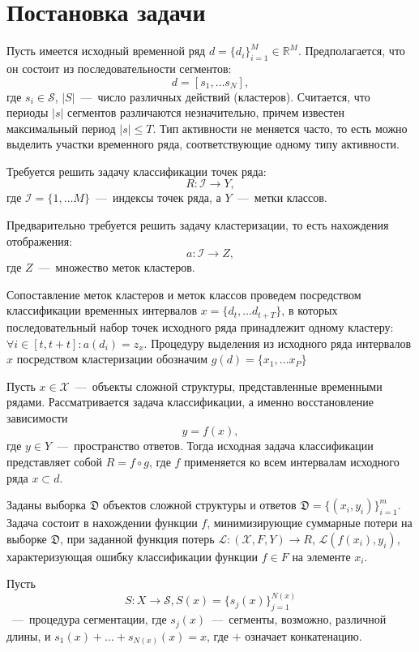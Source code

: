 \documentclass[12pt, twoside]{article}
\begin{document}
\section{Постановка задачи}

Пусть имеется исходный временной ряд $d=\{d_i\}_{i=1}^M\in \mathds{R}^M$. Предполагается, что он состоит из последовательности сегментов: $$d=[s_1,\ldots s_N],$$ где $s_i\in \mathcal{S}$, $|S|$~---~число различных действий (кластеров). Считается, что периоды $|s|$ сегментов различаются незначительно, причем известен максимальный период $|s|\leq T$. Тип активности не меняется часто, то есть можно выделить участки временного ряда, соответствующие одному типу активности.

Требуется решить задачу классификации точек ряда: $$R:\mathcal{I}\rightarrow Y,$$ где $\mathcal{I}=\{1,\ldots M\}$~---~индексы точек ряда, а $Y$~---~метки классов.

Предварительно требуется решить задачу кластеризации, то есть нахождения отображения: $$a:\mathcal{I}\rightarrow Z,$$ где $Z$~---~множество меток кластеров.

Сопоставление меток кластеров и меток классов проведем посредством классификации временных интервалов $x=\{d_t,\ldots d_{t+T}\}$, в которых последовательный набор точек исходного ряда принадлежит одному кластеру: $\forall i\in [t,t+t]:a(d_i)=z_x$. Процедуру выделения из исходного ряда интервалов $x$ посредством кластеризации обозначим $g(d)=\{x_1,\ldots x_P\}$

Пусть $x\in \mathcal{X}$~---~объекты сложной структуры, представленные временными рядами. Рассматривается задача классификации, а именно восстановление зависимости $$y=f(x),$$ где $y\in Y$~---~пространство ответов. Тогда исходная задача классификации представляет собой $R=f\circ g$, где $f$ применяется ко всем интервалам исходного ряда $x\subset d$.

Заданы выборка $\mathfrak{D}$ объектов сложной структуры и ответов $\mathfrak{D}=\{(x_i,y_i)\}_{i=1}^m$. Задача состоит в нахождении функции $f$, минимизирующие суммарные потери на выборке $\mathfrak{D}$, при заданной функция потерь $\mathscr{L}:(\mathcal{X},F,Y)\rightarrow R$, $\mathscr{L}(f(x_i),y_i)$, характеризующая ошибку классификации функции $f\in F$ на элементе $x_i$. 

Пусть $$S:X\rightarrow \mathcal{S}, S(x)=\{s_j(x)\}_{j=1}^{N(x)}$$~---~процедура сегментации, где $s_j(x)$~---~сегменты, возможно, различной длины, и $s_1(x)+\ldots+s_{N(x)}(x)=x$, где $+$ означает конкатенацию.
\end{document}
